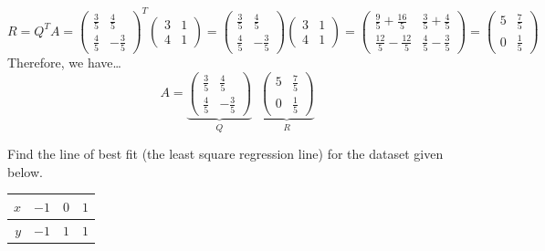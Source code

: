 \documentclass[12pt,letterpaper]{exam}
\begin{document}
\begin{questions}
{\[	R= Q^TA= \begin{pmatrix} \tfrac{3}{5} & \tfrac{4}{5} \\[0.1cm] \tfrac{4}{5} & -\tfrac{3}{5} \end{pmatrix}^T \begin{pmatrix} 3 & 1 \\ 4 & 1 \end{pmatrix}= \begin{pmatrix} \tfrac{3}{5} & \tfrac{4}{5} \\[0.1cm] \tfrac{4}{5} & -\tfrac{3}{5} \end{pmatrix} \begin{pmatrix} 3 & 1 \\ 4 & 1 \end{pmatrix}= \begin{pmatrix} \tfrac{9}{5} + \tfrac{16}{5} & \tfrac{3}{5} + \tfrac{4}{5} \\[0.1cm] \tfrac{12}{5} - \tfrac{12}{5} & \tfrac{4}{5} - \tfrac{3}{5} \end{pmatrix}= \begin{pmatrix} 5 & \tfrac{7}{5} \\[0.1cm] 0 & \tfrac{1}{5} \end{pmatrix}
	\]
Therefore, we have\dots
	\[
	\boxed{A= \underbrace{\begin{pmatrix} \tfrac{3}{5} & \tfrac{4}{5} \\[0.1cm] \tfrac{4}{5} & -\tfrac{3}{5} \end{pmatrix}}_{Q} \;\; \underbrace{\begin{pmatrix} 5 & \tfrac{7}{5} \\[0.1cm] 0 & \tfrac{1}{5} \end{pmatrix}}_{R}}
	\]
}



\newpage
\question[10] Find the line of best fit (the least square regression line) for the dataset given below. \par
	\begin{table}[!ht]
	\centering
	\begin{tabular}{r||ccc}
	$x$ & $-1$ & $0$ & $1$ \\ \hline
	$y$ & $-1$ & $1$ & $1$ \\[0.2pt]
	\end{tabular}
	\end{table} \par\vspace{0.3cm}


\end{questions}
\end{document}
